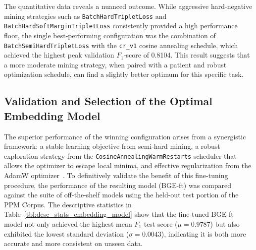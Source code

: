 The quantitative data reveals a nuanced outcome. While aggressive hard-negative mining strategies such as \verb|BatchHardTripletLoss| and \verb|BatchHardSoftMarginTripletLoss| consistently provided a high performance floor, the single best-performing configuration was the combination of \verb|BatchSemiHardTripletLoss| with the \verb|cr_v1| cosine annealing schedule, which achieved the highest peak validation \(F_1\)-score of 0.8104. This result suggests that a more moderate mining strategy, when paired with a patient and robust optimization schedule, can find a slightly better optimum for this specific task.

\subsection{Validation and Selection of the Optimal Embedding Model}\label{ch:4.4.3}
The superior performance of the winning configuration arises from a synergistic framework: a stable learning objective from semi-hard mining, a robust exploration strategy from the \verb|CosineAnnealingWarmRestarts| scheduler that allows the optimizer to escape local minima, and effective regularization from the AdamW optimizer~\cite{loshchilov2019decoupledweightdecayregularization, hermans2017defensetripletlossperson, Schroff_2015, loshchilovhutter}. To definitively validate the benefit of this fine-tuning procedure, the performance of the resulting model (BGE-ft) was compared against the suite of off-the-shelf models using the held-out test portion of the PPM Corpus. The descriptive statistics in Table~\ref{tbl:desc_stats_embedding_model} show that the fine-tuned BGE-ft model not only achieved the highest mean \(F_1\) test score (\(\mu = 0.9787\)) but also exhibited the lowest standard deviation (\(\sigma = 0.0043\)), indicating it is both more accurate and more consistent on unseen data.

\begin{table}[!ht]
    \captionsetup{skip=5pt}
\centering
\caption{Descriptive Statistics for F1-Scores by Embedding Model (Test Data)}
\label{tbl:desc_stats_embedding_model}
\end{table}

